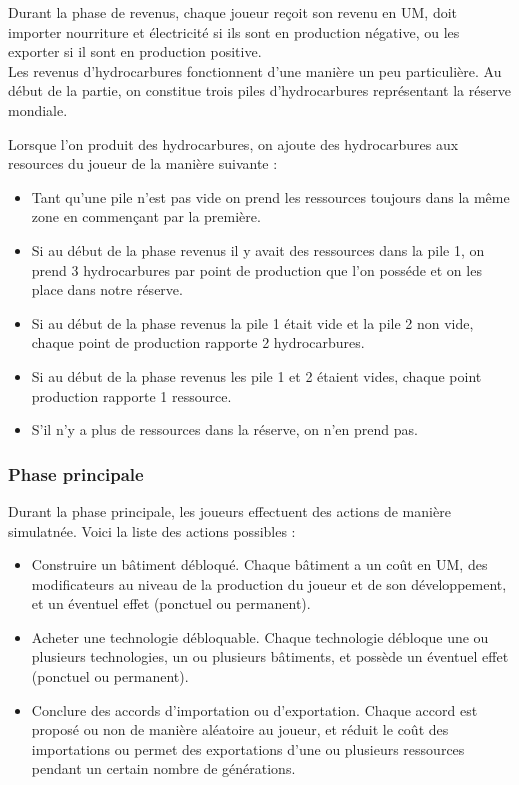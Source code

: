 \documentclass[12pt,twoside,a4paper]{article}
\begin{document}
Durant la phase de revenus, chaque joueur re\c coit son revenu en UM, doit importer nourriture et \'electricit\'e si ils sont en production n\'egative, ou les exporter si il sont en production positive.\\
Les revenus d'hydrocarbures fonctionnent d'une mani\`ere un peu particuli\`ere. Au d\'ebut de la partie, on constitue trois piles d'hydrocarbures repr\'esentant la r\'eserve mondiale. 

Lorsque l'on produit des hydrocarbures, on ajoute des hydrocarbures aux resources du joueur de la mani\`ere suivante :

\begin{itemize}
\item Tant qu'une pile n'est pas vide on prend les ressources toujours dans la m\^eme zone en commen\c cant par la premi\`ere.
\item Si au d\'ebut de la phase revenus il y avait des ressources dans la pile 1, on prend 3 hydrocarbures par point de production que l'on poss\'ede et on les place dans notre r\'eserve.
\item Si au d\'ebut de la phase revenus la pile 1 \'etait vide et la pile 2 non vide, chaque point de production rapporte 2 hydrocarbures.
\item Si au d\'ebut de la phase revenus les pile 1 et 2 \'etaient vides, chaque point production rapporte 1 ressource.
\item S'il n'y a plus de ressources dans la r\'eserve, on n'en prend pas.
\end{itemize}


\subsubsection{Phase principale}

Durant la phase principale, les joueurs effectuent des actions de mani\`ere simulatn\'ee. Voici la liste des actions possibles :

\begin{itemize}
\item Construire un b\^atiment d\'ebloqu\'e. Chaque b\^atiment a un co\^ut en UM, des modificateurs au niveau de la production du joueur et de son d\'eveloppement, et un \'eventuel effet (ponctuel ou permanent).
\item Acheter une technologie d\'ebloquable. Chaque technologie d\'ebloque une ou plusieurs technologies, un ou plusieurs b\^atiments, et poss\`ede un \'eventuel effet (ponctuel ou permanent).
\item Conclure des accords d'importation ou d'exportation. Chaque accord est propos\'e ou non de mani\`ere al\'eatoire au joueur, et r\'eduit le co\^ut des importations ou permet des exportations d'une ou plusieurs ressources pendant un certain nombre de g\'en\'erations.
\end{itemize}
\end{document}
